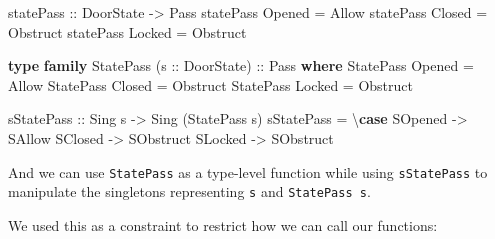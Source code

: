 \documentclass[]{article}
\newenvironment{Shaded}{}{}
\newcommand{\CommentTok}[1]{\textcolor[rgb]{0.38,0.63,0.69}{\textit{#1}}}
\newcommand{\DataTypeTok}[1]{\textcolor[rgb]{0.56,0.13,0.00}{#1}}
\newcommand{\FunctionTok}[1]{\textcolor[rgb]{0.02,0.16,0.49}{#1}}
\newcommand{\KeywordTok}[1]{\textcolor[rgb]{0.00,0.44,0.13}{\textbf{#1}}}
\newcommand{\NormalTok}[1]{#1}
\newcommand{\OperatorTok}[1]{\textcolor[rgb]{0.40,0.40,0.40}{#1}}
\newcommand{\OtherTok}[1]{\textcolor[rgb]{0.00,0.44,0.13}{#1}}
\newcommand{\StringTok}[1]{\textcolor[rgb]{0.25,0.44,0.63}{#1}}
\begin{document}
\begin{Shaded}
\begin{Highlighting}[]
\OtherTok{statePass ::} \DataTypeTok{DoorState} \OtherTok{{-}>} \DataTypeTok{Pass}
\NormalTok{statePass }\DataTypeTok{Opened} \OtherTok{=} \DataTypeTok{Allow}
\NormalTok{statePass }\DataTypeTok{Closed} \OtherTok{=} \DataTypeTok{Obstruct}
\NormalTok{statePass }\DataTypeTok{Locked} \OtherTok{=} \DataTypeTok{Obstruct}

\KeywordTok{type} \KeywordTok{family} \DataTypeTok{StatePass}\NormalTok{ (}\OtherTok{s ::} \DataTypeTok{DoorState}\NormalTok{)}\OtherTok{ ::} \DataTypeTok{Pass} \KeywordTok{where}
    \DataTypeTok{StatePass} \DataTypeTok{\textquotesingle{}Opened} \OtherTok{=} \DataTypeTok{\textquotesingle{}Allow}
    \DataTypeTok{StatePass} \DataTypeTok{\textquotesingle{}Closed} \OtherTok{=} \DataTypeTok{\textquotesingle{}Obstruct}
    \DataTypeTok{StatePass} \DataTypeTok{\textquotesingle{}Locked} \OtherTok{=} \DataTypeTok{\textquotesingle{}Obstruct}

\OtherTok{sStatePass ::} \DataTypeTok{Sing}\NormalTok{ s }\OtherTok{{-}>} \DataTypeTok{Sing}\NormalTok{ (}\DataTypeTok{StatePass}\NormalTok{ s)}
\NormalTok{sStatePass }\OtherTok{=}\NormalTok{ \textbackslash{}}\KeywordTok{case}
    \DataTypeTok{SOpened} \OtherTok{{-}>} \DataTypeTok{SAllow}
    \DataTypeTok{SClosed} \OtherTok{{-}>} \DataTypeTok{SObstruct}
    \DataTypeTok{SLocked} \OtherTok{{-}>} \DataTypeTok{SObstruct}
\end{Highlighting}
\end{Shaded}

And we can use \texttt{StatePass} as a type-level function while using
\texttt{sStatePass} to manipulate the singletons representing \texttt{s} and
\texttt{StatePass\ s}.

We used this as a constraint to restrict how we can call our functions:

\begin{Shaded}
\end{Shaded}
\end{document}
